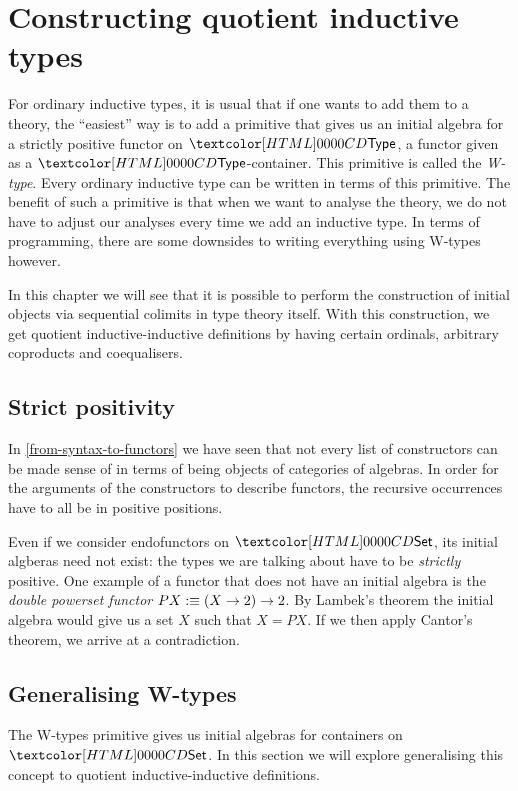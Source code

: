 \chapter{Constructing quotient inductive types}

For ordinary inductive types, it is usual that if one wants to add
them to a theory, the ``easiest'' way is to add a primitive that gives
us an initial algebra for a strictly positive functor on $\Type$, \ie
a functor given as a $\Type$-container. This primitive is called the
\emph{W-type}. Every ordinary inductive type can be written in terms
of this primitive. The benefit of such a primitive is that when we
want to analyse the theory, we do not have to adjust our analyses
every time we add an inductive type. In terms of programming, there
are some downsides to writing everything using W-types however.

In this chapter we will see that it is possible to perform the
construction of initial objects via sequential colimits in type theory
itself. With this construction, we get quotient inductive-inductive
definitions by having certain ordinals, arbitrary coproducts and
coequalisers.

\section{Strict positivity}

In \cref{from-syntax-to-functors} we have seen that not every list of
constructors can be made sense of in terms of being objects of
categories of algebras. In order for the arguments of the constructors
to describe functors, the recursive occurrences have to all be in
positive positions. 

Even if we consider endofunctors on $\Set$, its initial algberas need
not exist: the types we are talking about have to be \emph{strictly}
positive. One example of a functor that does not have an initial
algebra is the \emph{double powerset functor}
$P X :\equiv (X \to 2) \to 2$. By Lambek's theorem the initial algebra
would give us a set $X$ such that $X = P X$. If we then apply Cantor's
theorem, we arrive at a contradiction.

\section{Generalising W-types}

The W-types primitive gives us initial algebras for containers on
$\Set$. In this section we will explore generalising this concept to
quotient inductive-inductive definitions.

